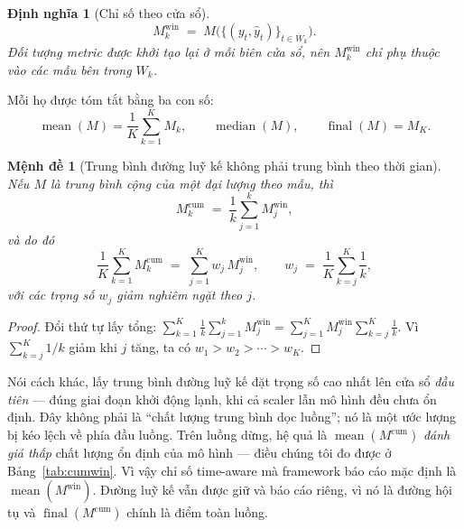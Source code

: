 \documentclass[11pt,a4paper]{article}
\newtheorem{proposition}{Mệnh đề}
\newtheorem{definition}{Định nghĩa}
\theoremstyle{remark}
\begin{document}
\begin{definition}[Chỉ số theo cửa sổ]
\begin{equation}
  M^{\mathrm{win}}_k \;=\; M\Big(\{(y_t,\hat y_t)\}_{t \in W_k}\Big).
\end{equation}
Đối tượng metric được khởi tạo lại ở mỗi biên cửa sổ, nên $M^{\mathrm{win}}_k$
chỉ phụ thuộc vào các mẫu \emph{bên trong} $W_k$.
\end{definition}

Mỗi họ được tóm tắt bằng ba con số:
\begin{equation}
  \label{eq:summary}
  \operatorname{mean}(M) = \frac{1}{K}\sum_{k=1}^{K} M_k,
  \qquad
  \operatorname{median}(M),
  \qquad
  \operatorname{final}(M) = M_K.
\end{equation}

\begin{proposition}[Trung bình đường luỹ kế không phải trung bình theo thời gian]
\label{prop:cumbias}
Nếu $M$ là trung bình cộng của một đại lượng theo mẫu, thì
\begin{equation}
  M^{\mathrm{cum}}_k \;=\; \frac{1}{k}\sum_{j=1}^{k} M^{\mathrm{win}}_j,
\end{equation}
và do đó
\begin{equation}
  \frac{1}{K}\sum_{k=1}^{K} M^{\mathrm{cum}}_k
  \;=\; \sum_{j=1}^{K} w_j\, M^{\mathrm{win}}_j,
  \qquad
  w_j \;=\; \frac{1}{K}\sum_{k=j}^{K}\frac{1}{k},
\end{equation}
với các trọng số $w_j$ \emph{giảm nghiêm ngặt} theo $j$.
\end{proposition}

\begin{proof}
Đổi thứ tự lấy tổng:
$\sum_{k=1}^{K}\frac{1}{k}\sum_{j=1}^{k}M^{\mathrm{win}}_j
= \sum_{j=1}^{K} M^{\mathrm{win}}_j \sum_{k=j}^{K}\frac1k$.
Vì $\sum_{k=j}^{K}1/k$ giảm khi $j$ tăng, ta có $w_1 > w_2 > \cdots > w_K$.
\end{proof}

Nói cách khác, lấy trung bình đường luỹ kế đặt trọng số cao nhất lên cửa sổ
\emph{đầu tiên} --- đúng giai đoạn khởi động lạnh, khi cả scaler lẫn mô hình đều
chưa ổn định. Đây không phải là ``chất lượng trung bình dọc luồng''; nó là một
ước lượng bị kéo lệch về phía đầu luồng. Trên luồng dừng, hệ quả là
$\operatorname{mean}(M^{\mathrm{cum}})$ \emph{đánh giá thấp} chất lượng ổn định
của mô hình --- điều chúng tôi đo được ở Bảng~\ref{tab:cumwin}. Vì vậy chỉ số
time-aware mà framework báo cáo mặc định là $\operatorname{mean}(M^{\mathrm{win}})$.
Đường luỹ kế vẫn được giữ và báo cáo riêng, vì nó là đường hội tụ và
$\operatorname{final}(M^{\mathrm{cum}})$ chính là điểm toàn luồng.
\end{document}
